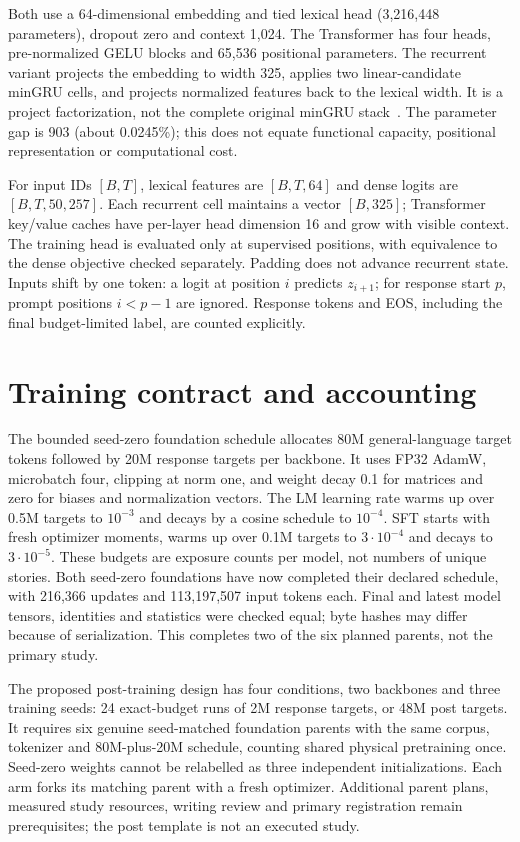 Both use a 64-dimensional embedding and tied lexical head (3,216,448
parameters), dropout zero and context 1,024. The Transformer has four heads,
pre-normalized GELU blocks and 65,536 positional parameters. The recurrent
variant projects the embedding to width 325, applies two linear-candidate
minGRU cells, and projects normalized features back to the lexical width.
It is a project factorization, not the complete original minGRU stack~\cite{mingru}.
The parameter gap is 903 (about 0.0245\%); this does not equate functional
capacity, positional representation or computational cost.

For input IDs $[B,T]$, lexical features are $[B,T,64]$ and dense logits are
$[B,T,50{,}257]$. Each recurrent cell maintains a vector $[B,325]$; Transformer
key/value caches have per-layer head dimension 16 and grow with visible context.
The training head is evaluated only at supervised positions, with equivalence
to the dense objective checked separately. Padding does not advance recurrent
state. Inputs shift by one token: a logit at position $i$ predicts $z_{i+1}$;
for response start $p$, prompt positions $i<p-1$ are ignored. Response tokens
and EOS, including the final budget-limited label, are counted explicitly.

\section{Training contract and accounting}
The bounded seed-zero foundation schedule allocates 80M general-language target
tokens followed by 20M response targets per backbone. It uses FP32 AdamW,
microbatch four, clipping at norm one, and weight decay 0.1 for matrices and zero
for biases and normalization vectors. The LM learning rate warms up over 0.5M
targets to $10^{-3}$ and decays by a cosine schedule to $10^{-4}$.
SFT starts with fresh optimizer moments, warms up over 0.1M targets to
$3\cdot10^{-4}$ and decays to $3\cdot10^{-5}$. These budgets are exposure
counts per model, not numbers of unique stories. Both seed-zero foundations
have now completed their declared schedule, with 216,366 updates and
113,197,507 input tokens each. Final and latest model tensors, identities and
statistics were checked equal; byte hashes may differ because of serialization.
This completes two of the six planned parents, not the primary study.

The proposed post-training design has four conditions, two backbones and three
training seeds: 24 exact-budget runs of 2M response targets, or 48M post targets.
It requires six genuine seed-matched foundation parents with the same corpus,
tokenizer and 80M-plus-20M schedule, counting shared physical pretraining once.
Seed-zero weights cannot be relabelled as three independent initializations.
Each arm forks its matching parent with a fresh optimizer. Additional parent
plans, measured study resources, writing review and primary registration remain
prerequisites; the post template is not an executed study.

